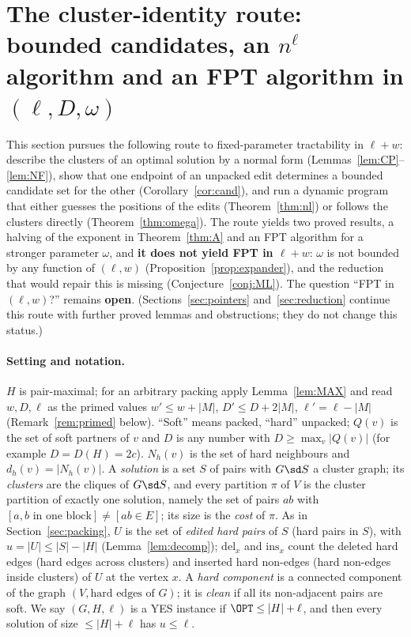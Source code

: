 \section{The cluster-identity route: bounded candidates, an \texorpdfstring{$n^{\ell}$}{n\^l} algorithm and an FPT algorithm in \texorpdfstring{$(\ell,D,\omega)$}{(l,D,omega)}}\label{sec:dproute}
This section pursues the following route to fixed-parameter tractability in $\ell+w$: describe the clusters of an optimal solution by a normal form (Lemmas~\ref{lem:CP}--\ref{lem:NF}), show that one endpoint of an unpacked edit determines a bounded candidate set for the other (Corollary~\ref{cor:cand}), and run a dynamic program that either guesses the positions of the edits (Theorem~\ref{thm:nl}) or follows the clusters directly (Theorem~\ref{thm:omega}). The route yields two proved results, a halving of the exponent in Theorem~\ref{thm:A} and an FPT algorithm for a stronger parameter $\omega$, and \textbf{it does not yield FPT in $\ell+w$}: $\omega$ is not bounded by any function of $(\ell,w)$ (Proposition~\ref{prop:expander}), and the reduction that would repair this is missing (Conjecture~\ref{conj:ML}). The question ``FPT in $(\ell,w)$?'' remains \textbf{open}. (Sections~\ref{sec:pointers} and~\ref{sec:reduction} continue this route with further proved lemmas and obstructions; they do not change this status.)

\paragraph{Setting and notation.}
$H$ is pair-maximal; for an arbitrary packing apply Lemma~\ref{lem:MAX} and read $w,D,\ell$ as the primed values $w'\le w+|M|$, $D'\le D+2|M|$, $\ell'=\ell-|M|$ (Remark~\ref{rem:primed} below). ``Soft'' means packed, ``hard'' unpacked; $Q(v)$ is the set of soft partners of $v$ and $D$ is any number with $D\ge\max_v|Q(v)|$ (for example $D=D(H)=2c$). $N_h(v)$ is the set of hard neighbours and $d_h(v)=|N_h(v)|$. A \emph{solution} is a set $S$ of pairs with $G\sd S$ a cluster graph; its \emph{clusters} are the cliques of $G\sd S$, and every partition $\pi$ of $V$ is the cluster partition of exactly one solution, namely the set of pairs $ab$ with $[a,b\text{ in one block}]\neq[ab\in E]$; its size is the \emph{cost} of $\pi$. As in Section~\ref{sec:packing}, $U$ is the set of \emph{edited hard pairs} of $S$ (hard pairs in $S$), with $u=|U|\le|S|-|H|$ (Lemma~\ref{lem:decomp}); $\mathrm{del}_x$ and $\mathrm{ins}_x$ count the deleted hard edges (hard edges across clusters) and inserted hard non-edges (hard non-edges inside clusters) of $U$ at the vertex $x$. A \emph{hard component} is a connected component of the graph $(V,\text{hard edges of }G)$; it is \emph{clean} if all its non-adjacent pairs are soft. We say $(G,H,\ell)$ is a YES instance if $\OPT\le|H|+\ell$, and then every solution of size $\le|H|+\ell$ has $u\le\ell$.

